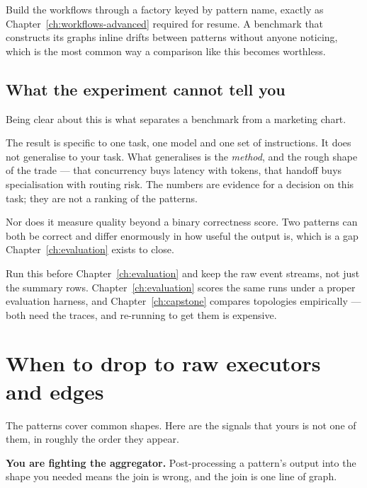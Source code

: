 \begin{note}
Build the workflows through a factory keyed by pattern name, exactly as
Chapter~\ref{ch:workflows-advanced} required for resume. A benchmark that
constructs its graphs inline drifts between patterns without anyone noticing,
which is the most common way a comparison like this becomes worthless.
\end{note}

\subsection{What the experiment cannot tell you}

Being clear about this is what separates a benchmark from a marketing chart.

The result is specific to one task, one model and one set of instructions. It
does not generalise to your task. What generalises is the \emph{method}, and the
rough shape of the trade --- that concurrency buys latency with tokens, that
handoff buys specialisation with routing risk. The numbers are evidence for a
decision on this task; they are not a ranking of the patterns.

Nor does it measure quality beyond a binary correctness score. Two patterns can
both be correct and differ enormously in how useful the output is, which is a gap
Chapter~\ref{ch:evaluation} exists to close.

\begin{note}
Run this before Chapter~\ref{ch:evaluation} and keep the raw event streams, not
just the summary rows. Chapter~\ref{ch:evaluation} scores the same runs under a
proper evaluation harness, and Chapter~\ref{ch:capstone} compares topologies
empirically --- both need the traces, and re-running to get them is expensive.
\end{note}

\section{When to drop to raw executors and edges}
\label{sec:orch-dropping}

The patterns cover common shapes. Here are the signals that yours is not one of
them, in roughly the order they appear.

\textbf{You are fighting the aggregator.} Post-processing a pattern's output into
the shape you needed means the join is wrong, and the join is one line of graph.

